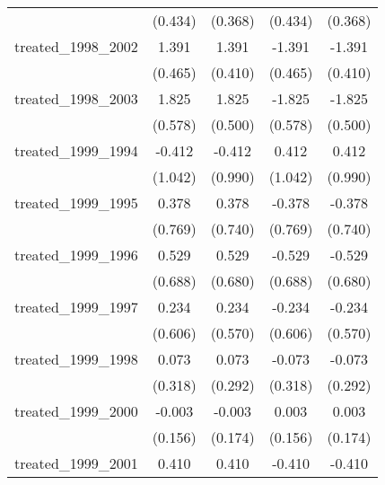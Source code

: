 {\begin{tabular}{l*{4}{c}}
            &     (0.434)         &     (0.368)         &     (0.434)         &     (0.368)         \\
[1em]
treated\_1998\_2002&       1.391\sym{**} &       1.391\sym{***}&      -1.391\sym{**} &      -1.391\sym{***}\\
            &     (0.465)         &     (0.410)         &     (0.465)         &     (0.410)         \\
[1em]
treated\_1998\_2003&       1.825\sym{**} &       1.825\sym{***}&      -1.825\sym{**} &      -1.825\sym{***}\\
            &     (0.578)         &     (0.500)         &     (0.578)         &     (0.500)         \\
[1em]
treated\_1999\_1994&      -0.412         &      -0.412         &       0.412         &       0.412         \\
            &     (1.042)         &     (0.990)         &     (1.042)         &     (0.990)         \\
[1em]
treated\_1999\_1995&       0.378         &       0.378         &      -0.378         &      -0.378         \\
            &     (0.769)         &     (0.740)         &     (0.769)         &     (0.740)         \\
[1em]
treated\_1999\_1996&       0.529         &       0.529         &      -0.529         &      -0.529         \\
            &     (0.688)         &     (0.680)         &     (0.688)         &     (0.680)         \\
[1em]
treated\_1999\_1997&       0.234         &       0.234         &      -0.234         &      -0.234         \\
            &     (0.606)         &     (0.570)         &     (0.606)         &     (0.570)         \\
[1em]
treated\_1999\_1998&       0.073         &       0.073         &      -0.073         &      -0.073         \\
            &     (0.318)         &     (0.292)         &     (0.318)         &     (0.292)         \\
[1em]
treated\_1999\_2000&      -0.003         &      -0.003         &       0.003         &       0.003         \\
            &     (0.156)         &     (0.174)         &     (0.156)         &     (0.174)         \\
[1em]
treated\_1999\_2001&       0.410         &       0.410         &      -0.410         &      -0.410         \\

\end{tabular}}
